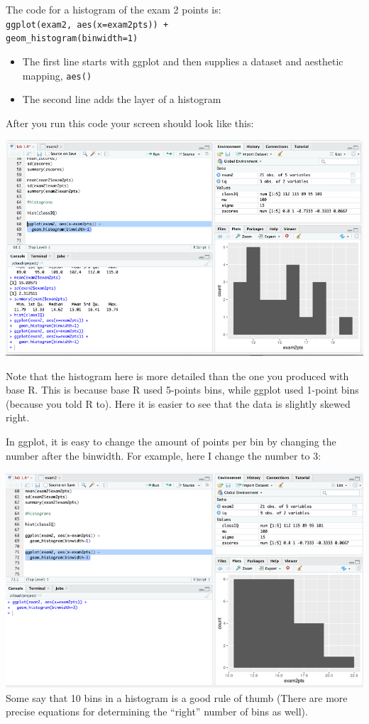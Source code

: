 \documentclass[
]{book}
\providecommand{\tightlist}{%
  \setlength{\itemsep}{0pt}\setlength{\parskip}{0pt}}
\begin{document}
The code for a histogram of the exam 2 points is:\\
\texttt{ggplot(exam2,\ aes(x=exam2pts))\ +}~\\
\texttt{geom\_histogram(binwidth=1)}

\begin{itemize}
\tightlist
\item
  The first line starts with ggplot and then supplies a dataset and aesthetic mapping, \texttt{aes()}\\
\item
  The second line adds the layer of a histogram
\end{itemize}

After you run this code your screen should look like this:

\includegraphics{img/tidyhist.png}

Note that the histogram here is more detailed than the one you produced with base R. This is because base R used 5-points bins, while ggplot used 1-point bins (because you told R to). Here it is easier to see that the data is slightly skewed right.

In ggplot, it is easy to change the amount of points per bin by changing the number after the binwidth. For example, here I change the number to 3:

\includegraphics{img/tidyhist2.png}
Some say that 10 bins in a histogram is a good rule of thumb (There are more precise equations for determining the ``right'' number of bins as well).
\end{document}
